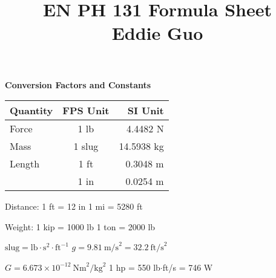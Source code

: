 \documentclass[twocolumn]{article}
\title{
	\vspace{-2em}
	\normalsize \textbf{EN PH 131 Formula Sheet} \\
	\small Eddie Guo \\
	\dotfill
	\vspace{-5em}
}
\date{}
\begin{document}
\maketitle

\small

\textbf{Conversion Factors and Constants}

\begin{table}[h]
    \centering
    \begin{tabular}{lcr}
        \toprule
        Quantity & FPS Unit & SI Unit \\
        \midrule
        Force & 1 lb & 4.4482 N \\
        Mass & 1 slug & 14.5938 kg \\
        Length & 1 ft & 0.3048 m \\
        & 1 in & 0.0254 m \\
        \bottomrule
    \end{tabular}
\end{table} \vspace{-.5em}

Distance: 1 ft = 12 in \hfill 1 mi = 5280 ft

Weight: 1 kip =  1000 lb \hfill 1 ton = 2000 lb

$\text{slug} = \text{lb} \cdot \text{s}^2 \cdot \text{ft}^{-1}$ \hfill $g = 9.81\ \text{m/s}^2 = 32.2\ \text{ft/s}^2$

$G = 6.673 \times 10^{-12}\ \text{Nm}^2/\text{kg}^2$ \hfill 1 hp = 550 lb$\cdot$ft/s = 746 W


    


    


\vspace{-.5em}
\dotfill
\end{document}
